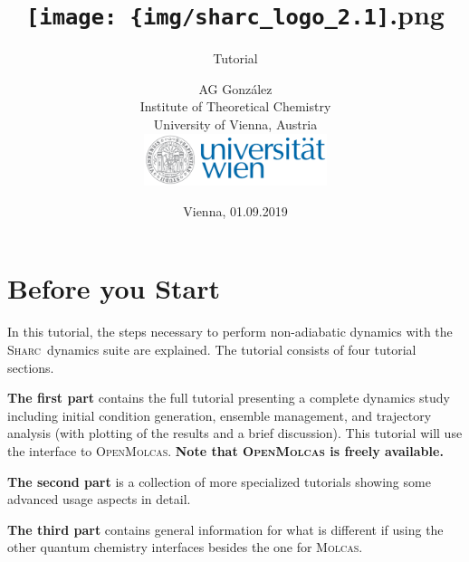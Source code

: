 \documentclass[a4paper,11pt,DIV=15,openany]{scrbook}
\title{\hspace{1cm}\texttt{[image: \{img/sharc\_logo\_2.1]}.png}\\[0.5cm]
\subtitle{Tutorial\\[1cm]}
\date{Vienna, 01.09.2019}
\author{AG Gonz\'alez\\
Institute of Theoretical Chemistry\\
University of Vienna, Austria
\vspace{1cm}
\\
\includegraphics[width=0.4\textwidth,keepaspectratio=true]{img/univie.pdf}}
\makeatletter
\newcommand{\ExternalLink}{%
      \tikz[x=1.2ex, y=1.2ex, baseline=-0.05ex]{%
          \begin{scope}[x=1ex, y=1ex]
              \clip (-0.1,-0.1) 
                  --++ (-0, 1.2) 
                  --++ (0.6, 0) 
                  --++ (0, -0.6) 
                  --++ (0.6, 0) 
                  --++ (0, -1);
              \path[draw, 
                  line width = 0.5, 
                  rounded corners=0.5] 
                  (0,0) rectangle (1,1);
          \end{scope}
          \path[draw, line width = 0.5] (0.5, 0.5) 
              -- (1, 1);
          \path[draw, line width = 0.5] (0.6, 1) 
              -- (1, 1) -- (1, 0.6);
          }
      }
\newcommand*{\link}{\begingroup\@makeother\#\@link}
\newcommand*{\@link}[2]{%
    \href{#1}{\ExternalLink\ifthenelse{\equal{#2}{}}{#1}{#2}}%
    \endgroup}
\newcommand{\sharc}{\textsc{Sharc}}
\newcommand{\todo}[1]{\textcolor{RL}{#1}}
\makeatother
\begin{document}
\tpage


\newpage
{}
\ohead{\leftmark\quad {\normalfont|} \quad\rightmark}
\ofoot[\pagemark]{\pagemark}


\tableofcontents


\chapter{Before you Start}

In this tutorial, the steps necessary to perform non-adiabatic dynamics with the \sharc\ dynamics suite are explained. 
The tutorial consists of four tutorial sections. 

\textbf{The first part} contains the full tutorial presenting a complete dynamics study including initial condition generation, ensemble management, and trajectory analysis (with plotting of the results and a brief discussion). 
This tutorial will use the interface to \textsc{OpenMolcas}.
\textbf{Note that \textsc{OpenMolcas} is freely available.}

\textbf{The second part} is a collection of more specialized tutorials showing some advanced usage aspects in detail.

\textbf{The third part} contains general information for what is different if using the other quantum chemistry interfaces besides the one for \textsc{Molcas}.
\end{document}
